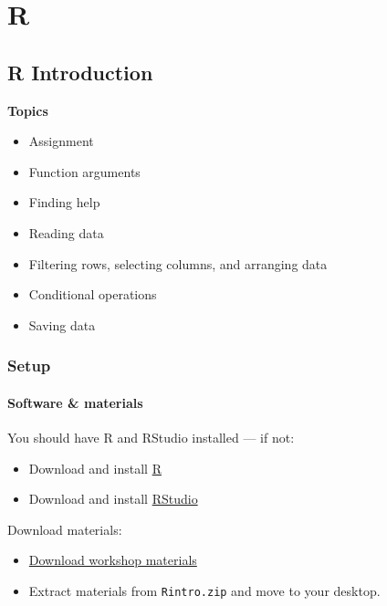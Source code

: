 \documentclass[]{book}
\providecommand{\tightlist}{%
  \setlength{\itemsep}{0pt}\setlength{\parskip}{0pt}}
\begin{document}
\part{R}\label{part-r}

\chapter{R Introduction}\label{r-introduction}

\textbf{Topics}

\begin{itemize}
\tightlist
\item
  Assignment
\item
  Function arguments
\item
  Finding help
\item
  Reading data
\item
  Filtering rows, selecting columns, and arranging data
\item
  Conditional operations
\item
  Saving data
\end{itemize}

\section{Setup}\label{setup}

\subsection{Software \& materials}\label{software-materials}

You should have R and RStudio installed --- if not:

\begin{itemize}
\tightlist
\item
  Download and install \href{http://cran.r-project.org}{R}
\item
  Download and install
  \href{https://www.rstudio.com/products/rstudio/download/\#download}{RStudio}
\end{itemize}

Download materials:

\begin{itemize}
\tightlist
\item
  \href{http://tutorials.iq.harvard.edu/R/Rintro.zip}{Download workshop
  materials}
\item
  Extract materials from \texttt{Rintro.zip} and move to your desktop.
\end{itemize}
\end{document}
